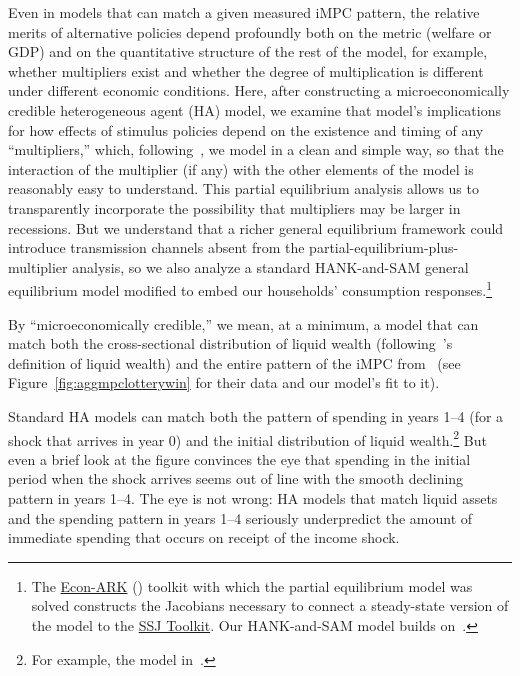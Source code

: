 \documentclass[qe,draft]{econsocart}
\theoremstyle{plain}
\theoremstyle{definition}
\begin{document}
Even in models that can match a given measured iMPC pattern, the relative merits of alternative policies depend profoundly both on the metric (welfare or GDP) and on the quantitative structure of the rest of the model, for example, whether multipliers exist and whether the degree of multiplication is different under different economic conditions. Here, after constructing a microeconomically credible heterogeneous agent (HA) model, we examine that model's implications for how effects of stimulus policies depend on the existence and timing of any ``multipliers,'' which, following~\cite{kmpHandbook}, we model in a clean and simple way, so that the interaction of the multiplier (if any) with the other elements of the model is reasonably easy to understand.
This partial equilibrium analysis allows us to transparently incorporate the possibility that multipliers may be larger in recessions.  But we understand that a richer general equilibrium framework could introduce transmission channels absent from the partial-equilibrium-plus-multiplier analysis, so we also analyze a standard HANK-and-SAM general equilibrium model modified to embed our households' consumption responses.\footnote{The \href{https://econ-ark.org}{Econ-ARK} (\cite{carroll_et_al-proc-scipy-2018}) toolkit with which the partial equilibrium model was solved constructs the Jacobians necessary to connect a steady-state version of the model to the \href{https://github.com/shade-econ/sequence-jacobian}{SSJ Toolkit}. Our HANK-and-SAM model builds on~\cite{Ravn2017,Ravn2021}.}

\label{microeconomically-credible}
By ``microeconomically credible,'' we mean, at a minimum, a model that can match both the cross-sectional distribution of liquid wealth (following~\cite{kaplan2014model}'s definition of liquid wealth) and the entire pattern of the iMPC from~\cite{fagereng-mpc-2021} (see Figure~\ref{fig:aggmpclotterywin} for their data and our model's fit to it).

\label{excess-initial-mpc}
Standard HA models can match both the pattern of spending in years 1--4 (for a shock that arrives in year 0) and the initial distribution of liquid wealth.\footnote{For example, the model in~\cite{cstwMPC}.}  But even a brief look at the figure convinces the eye that spending in the initial period when the shock arrives seems out of line with the smooth declining pattern in years 1--4.  The eye is not wrong: HA models that match liquid assets and the spending pattern in years 1--4 seriously underpredict the amount of immediate spending that occurs on receipt of the income shock.
\end{document}
